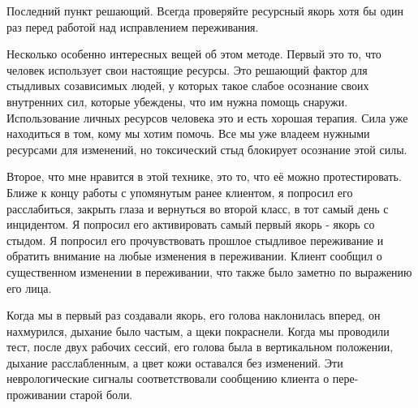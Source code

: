 \documentclass[10pt, fleqn]{article}
\begin{document}
Последний пункт решающий. Всегда проверяйте ресурсный якорь хотя бы один раз перед работой над исправлением переживания.

Несколько особенно интересных вещей об этом методе. Первый это то, что человек использует свои настоящие ресурсы. Это решающий фактор для стыдливых созависимых людей, у которых такое слабое осознание своих внутренних сил, которые убеждены, что им нужна помощь снаружи. Использование личных ресурсов человека это и есть хорошая терапия. Сила уже находиться в том, кому мы хотим помочь. Все мы уже владеем нужными ресурсами для изменений, но токсический стыд блокирует осознание этой силы.

Второе, что мне нравится в этой технике, это то, что её можно протестировать. Ближе к концу работы с упомянутым ранее клиентом, я попросил его расслабиться, закрыть глаза и вернуться во второй класс, в тот самый день с инцидентом. Я попросил его активировать самый первый якорь - якорь со стыдом. Я попросил его прочувствовать прошлое стыдливое переживание и обратить внимание на любые изменения в переживании. Клиент сообщил о существенном изменении в переживании, что также было заметно по выражению его лица.

Когда мы в первый раз создавали якорь, его голова наклонилась вперед, он нахмурился, дыхание было частым, а щеки покраснели. Когда мы проводили тест, после двух рабочих сессий, его голова была в вертикальном положении, дыхание расслабленным, а цвет кожи оставался без изменений. Эти неврологические сигналы соответствовали сообщению клиента о пере-проживании старой боли.


\end{document}
